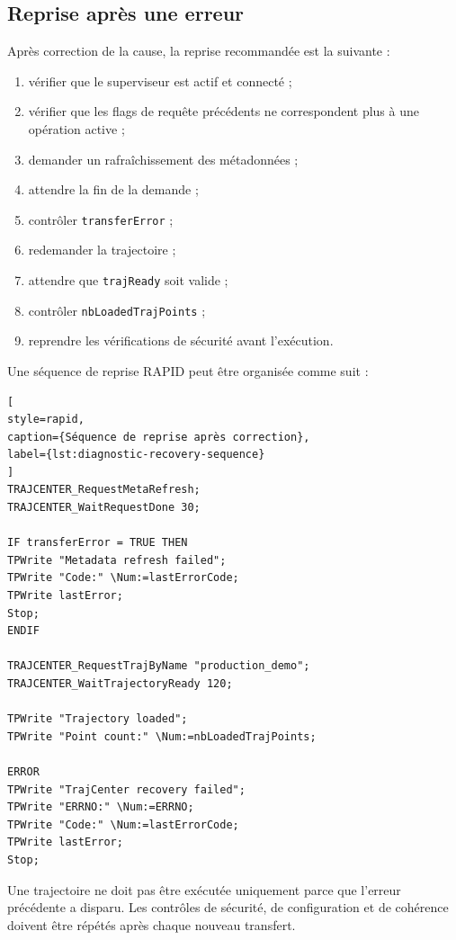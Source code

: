 \documentclass{rapportENSAM}
\begin{document}
\subsection{Reprise après une erreur}
\label{subsec:diagnostic-recovery}

Après correction de la cause, la reprise recommandée est la suivante :

\begin{enumerate}
\item vérifier que le superviseur est actif et connecté ;
\item vérifier que les flags de requête précédents ne correspondent plus à
une opération active ;
\item demander un rafraîchissement des métadonnées ;
\item attendre la fin de la demande ;
\item contrôler \texttt{transferError} ;
\item redemander la trajectoire ;
\item attendre que \texttt{trajReady} soit valide ;
\item contrôler \texttt{nbLoadedTrajPoints} ;
\item reprendre les vérifications de sécurité avant l'exécution.
\end{enumerate}

Une séquence de reprise RAPID peut être organisée comme suit :

\begin{lstlisting}[
style=rapid,
caption={Séquence de reprise après correction},
label={lst:diagnostic-recovery-sequence}
]
TRAJCENTER_RequestMetaRefresh;
TRAJCENTER_WaitRequestDone 30;

IF transferError = TRUE THEN
TPWrite "Metadata refresh failed";
TPWrite "Code:" \Num:=lastErrorCode;
TPWrite lastError;
Stop;
ENDIF

TRAJCENTER_RequestTrajByName "production_demo";
TRAJCENTER_WaitTrajectoryReady 120;

TPWrite "Trajectory loaded";
TPWrite "Point count:" \Num:=nbLoadedTrajPoints;

ERROR
TPWrite "TrajCenter recovery failed";
TPWrite "ERRNO:" \Num:=ERRNO;
TPWrite "Code:" \Num:=lastErrorCode;
TPWrite lastError;
Stop;
\end{lstlisting}

Une trajectoire ne doit pas être exécutée uniquement parce que l'erreur
précédente a disparu. Les contrôles de sécurité, de configuration et de
cohérence doivent être répétés après chaque nouveau transfert.
\end{document}
